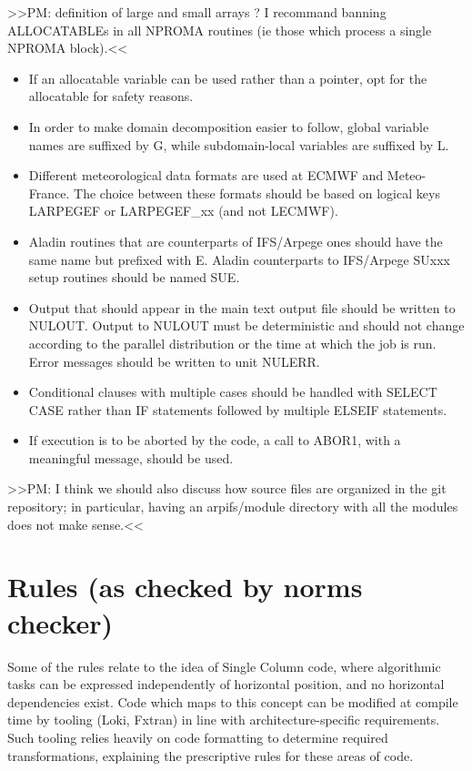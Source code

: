 \documentclass[letterpaper,10pt,english]{sphinxmanual}
\begin{document}
\textgreater{}\textgreater{}PM: definition of large and small arrays ? I recommand banning ALLOCATABLEs in all NPROMA routines
(ie those which process a single NPROMA block).\textless{}\textless{}
\begin{itemize}
\item {} 
If an allocatable variable can be used rather than a pointer, opt for the allocatable for
safety reasons.

\item {} 
In order to make domain decomposition easier to follow, global variable names are suffixed by G,
while subdomain-local variables are suffixed by L.

\item {} 
Different meteorological data formats are used at ECMWF and Meteo-France.
The choice between these formats should be based on logical keys LARPEGEF or LARPEGEF\_xx
(and not LECMWF).

\item {} 
Aladin routines that are counterparts of IFS/Arpege ones should have the same name but
prefixed with E.
Aladin counterparts to IFS/Arpege SUxxx setup routines should be named SUE.

\item {} 
Output that should appear in the main text output file should be written to NULOUT.
Output to NULOUT must be deterministic and should not change according to the
parallel distribution or the time at which the job is run.
Error messages should be written to unit NULERR.

\item {} 
Conditional clauses with multiple cases should be handled with SELECT CASE rather than IF
statements followed by multiple ELSEIF statements.

\item {} 
If execution is to be aborted by the code, a call to ABOR1, with a meaningful message,
should be used.

\end{itemize}

\textgreater{}\textgreater{}PM: I think we should also discuss how source files are organized in the git repository;
in particular, having an arpifs/module directory with all the modules does not make
sense.\textless{}\textless{}


\chapter{Rules (as checked by norms checker)}
\label{\detokenize{index:rules-as-checked-by-norms-checker}}
Some of the rules relate to the idea of Single Column code, where algorithmic tasks can be expressed
independently of horizontal position, and no horizontal dependencies exist. Code which maps to this
concept can be modified at compile time by tooling (Loki, Fxtran) in line with architecture-specific
requirements. Such tooling relies heavily on code formatting to determine required transformations,
explaining the prescriptive rules for these areas of code.
\end{document}
